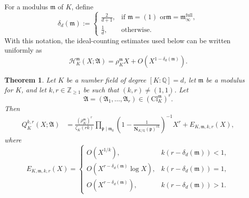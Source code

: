 \documentclass[11pt, reqno]{amsart}
\numberwithin{equation}{section}
\newtheorem{theorem}{Theorem}[section]
\newcommand{\Z}{\mathbb{Z}}
\newcommand{\Q}{\mathbb{Q}}
\newcommand{\Nrm}[2]{\mathbf{N}_{#1}(#2)}
\theoremstyle{definition}
\begin{document}
For a modulus $\mathfrak{m}$ of $K$, define
\begin{equation}
\delta_d(\mathfrak{m})
:=
\begin{cases}
\displaystyle \frac{2}{d+1},
&
\text{if $\mathfrak{m}=(1)$ or
$\mathfrak{m}=\mathfrak{m}_{\infty}^{\mathrm{full}}$},
\\[8pt]
\displaystyle \frac{1}{d},
&
\text{otherwise}.
\end{cases}
\end{equation}
With this notation, the ideal-counting estimates used below can be written uniformly as
\begin{equation}
\label{eqn:unified-ideal-counting}
\mathcal{H}_K^{\mathfrak{m}}(X;\mathfrak{A})
=
\rho_K^{\mathfrak{m}}X
+
O\left(
X^{1-\delta_d(\mathfrak{m})}
\right).
\end{equation}




\begin{theorem}\label{thm:main-theorem-tuples}
Let $K$ be a number field of degree $[K:\Q]=d$, let
$\mathfrak{m}$ be a modulus for $K$, and let $k,r\in\Z_{\geq1}$
be such that $(k,r)\neq(1,1)$. Let
\[
\boldsymbol{\mathfrak{A}}
=
(\mathfrak{A}_1,\ldots,\mathfrak{A}_r)
\in
\left(\mathrm{Cl}_K^{\mathfrak{m}}\right)^r.
\]
Then
\begin{align}
Q_K^{k,r}(X;\boldsymbol{\mathfrak{A}})
&=
\frac{\left(\rho_K^{\mathfrak{m}}\right)^r}
{\zeta_K(rk)}
\prod_{\mathfrak{p}\mid\mathfrak{m}_0}
\left(
1-\frac{1}
{\Nrm{K/\Q}{\mathfrak{p}}^{rk}}
\right)^{-1}
X^r
+
E_{K,\mathfrak{m},k,r}(X),
\label{eqn:main-theorem-tuples-asymptotic}
\end{align}
where
\begin{equation}\label{eqn:main-theorem-tuples-error}
E_{K,\mathfrak{m},k,r}(X)
=
\begin{cases}
\displaystyle
O\left(X^{1/k}\right),
&
k\left(r-\delta_d(\mathfrak{m})\right)<1,
\\[8pt]
\displaystyle
O\left(
X^{r-\delta_d(\mathfrak{m})}\log X
\right),
&
k\left(r-\delta_d(\mathfrak{m})\right)=1,
\\[8pt]
\displaystyle
O\left(
X^{r-\delta_d(\mathfrak{m})}
\right),
&
k\left(r-\delta_d(\mathfrak{m})\right)>1.
\end{cases}
\end{equation}

\end{theorem}
\end{document}
